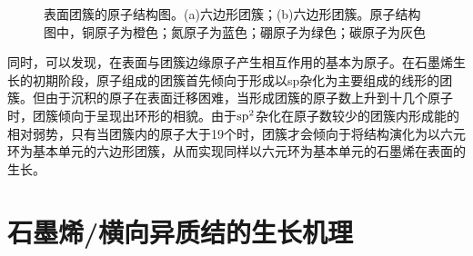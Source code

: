     \begin{figure}[htb]
        \caption{表面团簇的原子结构图。(a)六边形团簇；(b)六边形团簇。原子结构图中，铜原子为橙色；氮原子为蓝色；硼原子为绿色；碳原子为灰色}
        \label{fig:CG_CG_structure_22-24C}
    \end{figure}

    同时，可以发现，在表面与团簇边缘原子产生相互作用的基本为原子。在石墨烯生长的初期阶段，原子组成的团簇首先倾向于形成以sp杂化为主要组成的线形的团簇。但由于沉积的原子在表面迁移困难，当形成团簇的原子数上升到十几个原子时，团簇倾向于呈现出环形的相貌。由于$\rm sp^2$杂化在原子数较少的团簇内形成能的相对弱势，只有当团簇内的原子大于19个时，团簇才会倾向于将结构演化为以六元环为基本单元的六边形团簇，从而实现同样以六元环为基本单元的石墨烯在表面的生长。

\section{石墨烯/横向异质结的生长机理}
